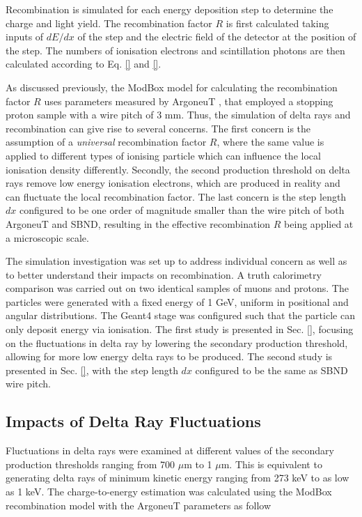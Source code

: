 Recombination is simulated for each energy deposition step to determine the charge and light yield.
The recombination factor $R$ is first calculated taking inputs of $dE/dx$ of the step and the electric field of the detector at the position of the step.
The numbers of ionisation electrons and scintillation photons are then calculated according to Eq. \ref{} and \ref{}.

As discussed previously, the ModBox model for calculating the recombination factor $R$ uses parameters measured by ArgoneuT \cite{}, that employed a stopping proton sample with a wire pitch of 3 mm.
Thus, the simulation of delta rays and recombination can give rise to several concerns.
The first concern is the assumption of a \textit{universal} recombination factor $R$, where the same value is applied to different types of ionising particle which can influence the local ionisation density differently. 
Secondly, the second production threshold on delta rays remove low energy ionisation electrons, which are produced in reality and can fluctuate the local recombination factor. 
The last concern is the step length $dx$ configured to be one order of magnitude smaller than the wire pitch of both ArgoneuT and SBND, resulting in the effective recombination $R$ being applied at a microscopic scale.

The simulation investigation was set up to address individual concern as well as to better understand their impacts on recombination.
A truth calorimetry comparison was carried out on two identical samples of muons and protons. 
The particles were generated with a fixed energy of 1 GeV, uniform in positional and angular distributions.
The Geant4 stage was configured such that the particle can only deposit energy via ionisation.
The first study is presented in Sec. \ref{}, focusing on the fluctuations in delta ray by lowering the secondary production threshold, allowing for more low energy delta rays to be produced.
The second study is presented in Sec. \ref{}, with the step length $dx$ configured to be the same as SBND wire pitch. 

\subsection{Impacts of Delta Ray Fluctuations}
\label{sec:impactDeltaRay}

Fluctuations in delta rays were examined at different values of the secondary production thresholds ranging from 700 $\mu$m to 1 $\mu$m.
This is equivalent to generating delta rays of minimum kinetic energy ranging from 273 keV to as low as 1 keV.
The charge-to-energy estimation was calculated using the ModBox recombination model with the ArgoneuT parameters as follow

